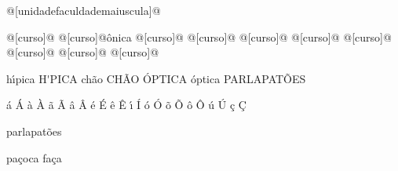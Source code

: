 @[unidadefaculdademaiuscula]@

@[curso]@
@[curso]@\^onica
@[curso]@
@[curso]@
@[curso]@
@[curso]@
@[curso]@
@[curso]@
@[curso]@
@[curso]@

h\'{\i}pica
H\'{\I}PICA
ch\~ao
CH\~AO
\'OPTICA
\'optica
PARLAPAT\~OES

\'a
\'A
\`a
\`A
\~a
\~A
\^a
\^A
\'e
\'E
\^e
\^E
\'{\i}
\'I
\'o
\'O
\~o
\~O
\^o
\^O
\'u
\'U
\c{c}
\c{C}

parlapat\~oes


pa\c{c}oca
fa\c{c}a



